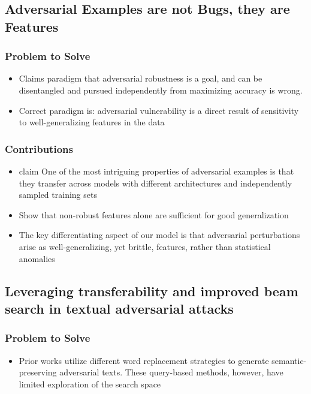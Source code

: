 \documentclass{article}
\begin{document}
\begin{flushleft}
 
\subsection{ Adversarial Examples are not Bugs, they are Features \cite{}} 
\subsubsection*{Problem to Solve}
\begin{itemize}
    \item Claims paradigm that adversarial robustness is a goal, and can be disentangled and pursued independently from maximizing accuracy is wrong.
    \item Correct paradigm is: adversarial vulnerability is a direct result of sensitivity to well-generalizing features in the data
\end{itemize}

\subsubsection*{Contributions}
\begin{itemize}
 \item claim One of the most intriguing properties of adversarial examples is that they transfer across models with different architectures and independently sampled training sets
 \item Show that non-robust features alone are sufficient for good generalization
 \item The key differentiating aspect of our model is that adversarial perturbations arise as well-generalizing, yet brittle, features, rather than statistical anomalies
\end{itemize}





 


\subsection{Leveraging transferability and improved beam search in textual adversarial attacks   \cite{zhu2022leveraging}} 
\subsubsection*{Problem to Solve}
\begin{itemize}
    \item Prior works utilize different word replacement strategies to generate semantic-preserving adversarial texts. These query-based methods, however, have limited exploration of the search space
\end{itemize}


\end{flushleft}
\end{document}
